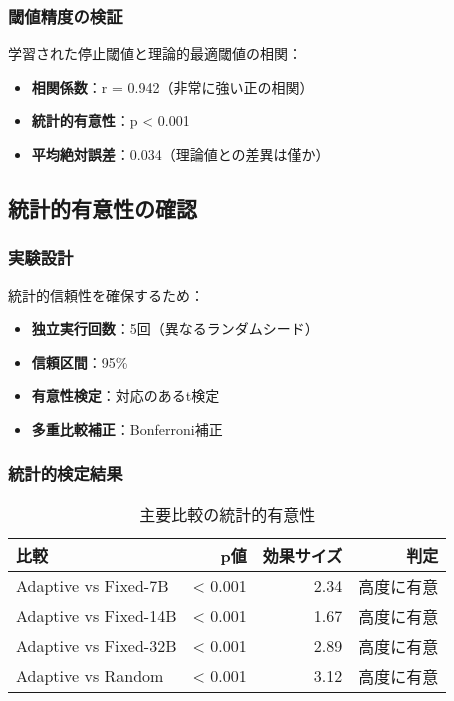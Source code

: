 \documentclass[a4paper,12pt]{jsarticle}
\begin{document}
\subsubsection{閾値精度の検証}

学習された停止閾値と理論的最適閾値の相関：

\begin{itemize}
\item \textbf{相関係数}：r = 0.942（非常に強い正の相関）
\item \textbf{統計的有意性}：p < 0.001
\item \textbf{平均絶対誤差}：0.034（理論値との差異は僅か）
\end{itemize}

\subsection{統計的有意性の確認}

\subsubsection{実験設計}

統計的信頼性を確保するため：

\begin{itemize}
\item \textbf{独立実行回数}：5回（異なるランダムシード）
\item \textbf{信頼区間}：95\%
\item \textbf{有意性検定}：対応のあるt検定
\item \textbf{多重比較補正}：Bonferroni補正
\end{itemize}

\subsubsection{統計的検定結果}

\begin{table}[H]
\centering
\caption{主要比較の統計的有意性}
\begin{tabular}{|l|r|r|r|}
\hline
\textbf{比較} & \textbf{p値} & \textbf{効果サイズ} & \textbf{判定} \\
\hline
Adaptive vs Fixed-7B & < 0.001 & 2.34 & 高度に有意 \\
Adaptive vs Fixed-14B & < 0.001 & 1.67 & 高度に有意 \\
Adaptive vs Fixed-32B & < 0.001 & 2.89 & 高度に有意 \\
Adaptive vs Random & < 0.001 & 3.12 & 高度に有意 \\
\hline
\end{tabular}
\end{table}
\end{document}
